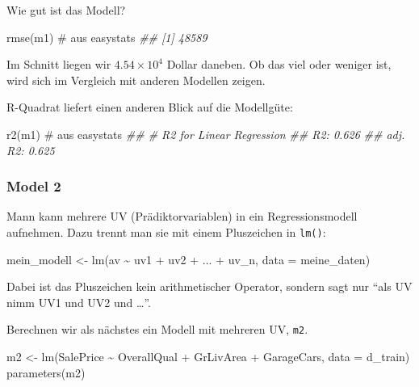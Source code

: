 \documentclass[
  letterpaper,
]{scrbook}
\newenvironment{Shaded}{\begin{snugshade}}{\end{snugshade}}
\newcommand{\AttributeTok}[1]{\textcolor[rgb]{0.40,0.45,0.13}{#1}}
\newcommand{\CommentTok}[1]{\textcolor[rgb]{0.37,0.37,0.37}{#1}}
\newcommand{\DocumentationTok}[1]{\textcolor[rgb]{0.37,0.37,0.37}{\textit{#1}}}
\newcommand{\FunctionTok}[1]{\textcolor[rgb]{0.28,0.35,0.67}{#1}}
\newcommand{\NormalTok}[1]{\textcolor[rgb]{0.00,0.23,0.31}{#1}}
\newcommand{\OtherTok}[1]{\textcolor[rgb]{0.00,0.23,0.31}{#1}}
\newcommand{\SpecialCharTok}[1]{\textcolor[rgb]{0.37,0.37,0.37}{#1}}
\theoremstyle{definition}
\theoremstyle{definition}
\theoremstyle{definition}
\theoremstyle{remark}
\begin{document}
Wie gut ist das Modell?

\begin{Shaded}
\begin{Highlighting}[]
\FunctionTok{rmse}\NormalTok{(m1)  }\CommentTok{\# aus easystats}
\DocumentationTok{\#\# [1] 48589}
\end{Highlighting}
\end{Shaded}

Im Schnitt liegen wir \ensuremath{4.54\times 10^{4}} Dollar daneben. Ob
das viel oder weniger ist, wird sich im Vergleich mit anderen Modellen
zeigen.

R-Quadrat liefert einen anderen Blick auf die Modellgüte:

\begin{Shaded}
\begin{Highlighting}[]
\FunctionTok{r2}\NormalTok{(m1)  }\CommentTok{\# aus easystats}
\DocumentationTok{\#\# \# R2 for Linear Regression}
\DocumentationTok{\#\#        R2: 0.626}
\DocumentationTok{\#\#   adj. R2: 0.625}
\end{Highlighting}
\end{Shaded}

\subsubsection{Model 2}\label{model-2}

Mann kann mehrere UV (Prädiktorvariablen) in ein Regressionsmodell
aufnehmen. Dazu trennt man sie mit einem Pluszeichen in \texttt{lm()}:

\begin{Shaded}
\begin{Highlighting}[]
\NormalTok{mein\_modell }\OtherTok{\textless{}{-}} \FunctionTok{lm}\NormalTok{(av }\SpecialCharTok{\textasciitilde{}}\NormalTok{ uv1 }\SpecialCharTok{+}\NormalTok{ uv2 }\SpecialCharTok{+}\NormalTok{ ... }\SpecialCharTok{+}\NormalTok{ uv\_n, }\AttributeTok{data =}\NormalTok{ meine\_daten)}
\end{Highlighting}
\end{Shaded}

Dabei ist das Pluszeichen kein arithmetischer Operator, sondern sagt nur
\enquote{als UV nimm UV1 und UV2 und \ldots{}}.

Berechnen wir als nächstes ein Modell mit mehreren UV, \texttt{m2}.

\begin{Shaded}
\begin{Highlighting}[]
\NormalTok{m2 }\OtherTok{\textless{}{-}} \FunctionTok{lm}\NormalTok{(SalePrice }\SpecialCharTok{\textasciitilde{}}\NormalTok{ OverallQual }\SpecialCharTok{+}\NormalTok{ GrLivArea }\SpecialCharTok{+}\NormalTok{ GarageCars, }\AttributeTok{data =}\NormalTok{ d\_train)}
\FunctionTok{parameters}\NormalTok{(m2)}
\end{Highlighting}
\end{Shaded}
\end{document}
